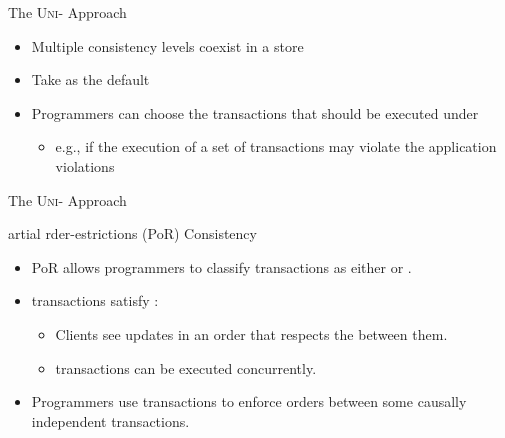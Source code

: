 \begin{frame}{The \textsc{Uni-} Approach}
  \begin{itemize}[<+->]
    \setlength{\itemsep}{8pt}
    \item Multiple consistency levels coexist in a store
    \item Take  as the default
    \item Programmers can choose the transactions that should be executed under
           \\[3pt]
          \begin{itemize}
            \item e.g., if the execution of a set of transactions may violate the application
                  violations
          \end{itemize}
  \end{itemize}
\end{frame}

\begin{frame}{The \textsc{Uni-} Approach}
  \begin{center}
    {artial rder-estrictions (PoR) Consistency} \\[3pt]
  \end{center}

  \pause
  \begin{itemize}
    \setlength{\itemsep}{8pt}
    \item PoR allows programmers to classify transactions as either 
          or . \pause
    \item {} transactions satisfy \cc:
          \begin{itemize}
            \item Clients see updates in an order that respects the 
                  between them. \\[3pt]
            \item {} transactions can be executed concurrently.
          \end{itemize}
          \pause
    \item Programmers use  transactions to enforce orders between
          some causally independent transactions.
  \end{itemize}
\end{frame}

